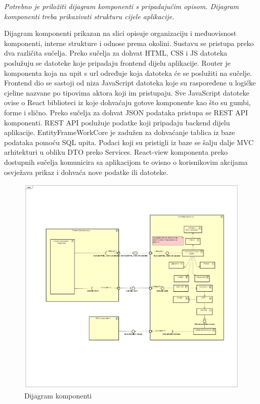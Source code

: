 			 \textit{Potrebno je priložiti dijagram komponenti s pripadajućim opisom. Dijagram komponenti treba prikazivati strukturu cijele aplikacije.}

			 Dijagram komponenti prikazan na slici opisuje organizaciju i međuovisnost komponenti, interne strukture i odnose prema okolini. Sustavu se pristupa preko dva različita sučelja. Preko sučelja za dohvat HTML, CSS i JS datoteka poslužuju se datoteke koje pripadaju frontend dijelu aplikacije. Router je komponenta koja na upit s url određuje koja datoteka će se poslužiti na sučelje. Frontend dio se sastoji od niza JavaScript datoteka koje su raspoređene u logičke cjeline nazvane po tipovima aktora koji im pristupaju. Sve JavaScript datoteke ovise o React biblioteci iz koje dohvaćaju gotove komponente kao što su gumbi, forme i slično. Preko sučelja za dohvat JSON podataka pristupa se REST API komponenti. REST API poslužuje podatke koji pripadaju backend dijelu aplikacije. EntityFrameWorkCore je zadužen za dohvaćanje tablica iz baze podataka pomoću SQL upita. Podaci koji su pristigli iz baze se šalju dalje MVC arhitekturi u obliku DTO preko Services. React-view komponenta preko dostupnih sučelja komunicira sa aplikacijom te ovisno o korisnikovim akcijama osvježava prikaz i dohvaća nove podatke ili datoteke.

			 \begin{figure}[H]
				\includegraphics[scale=0.5]{slike/dijagram_komponenti.png} %
				\centering
				\caption{Dijagram komponenti}
				\label{fig:promjene}
			\end{figure}
			 
		\fi